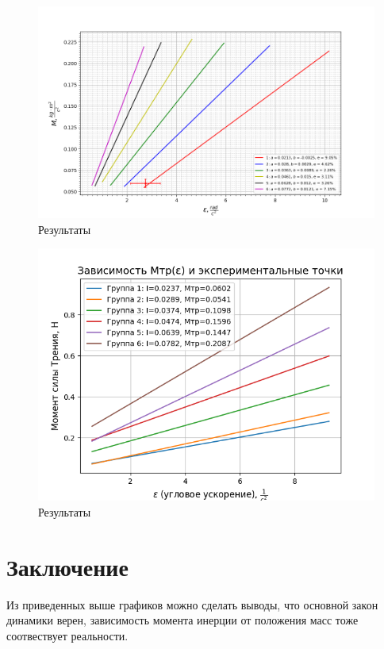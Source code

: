 \documentclass[a4paper]{article}
\begin{document}
\begin{figure}[H]
\begin{center}
	\includegraphics[scale=0.5]{M(eps).png}
	\caption{Результаты}
\end{center}
\end{figure}
\begin{figure}[H]
\begin{center}
	\includegraphics[scale=0.5]{Figure_1.png}
	\caption{Результаты}
\end{center}
\end{figure}


\section{Заключение}
Из приведенных выше графиков можно сделать выводы, что основной закон динамики верен, зависимость момента инерции от положения масс тоже соотвествует реальности.\\
\end{document}

